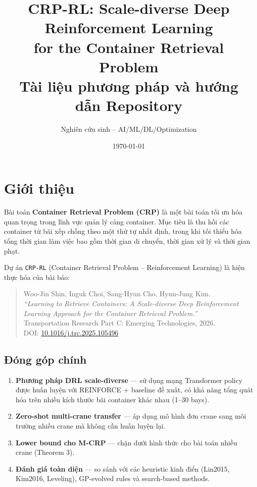 \documentclass[11pt,a4paper]{article}
\title{\textbf{CRP-RL: Scale-diverse Deep Reinforcement Learning \\ for the Container Retrieval Problem}\\[4pt]
\large Tài liệu phương pháp và hướng dẫn Repository}
\author{Nghiên cứu sinh -- AI/ML/DL/Optimization}
\date{\today}
\theoremstyle{definition}
\begin{document}
\maketitle
\tableofcontents
\newpage

\section{Giới thiệu}

Bài toán \textbf{Container Retrieval Problem (CRP)} là một bài toán tối ưu hóa quan trọng trong lĩnh vực quản lý cảng container. Mục tiêu là thu hồi các container từ bãi xếp chồng theo một thứ tự nhất định, trong khi tối thiểu hóa tổng thời gian làm việc bao gồm thời gian di chuyển, thời gian xử lý và thời gian phạt.

Dự án \texttt{CRP-RL} (Container Retrieval Problem -- Reinforcement Learning) là hiện thực hóa của bài báo:
\begin{quote}
    Woo-Jin Shin, Inguk Choi, Sang-Hyun Cho, Hyun-Jung Kim. \\
    \textit{``Learning to Retrieve Containers: A Scale-diverse Deep Reinforcement Learning Approach for the Container Retrieval Problem.''} \\
    Transportation Research Part C: Emerging Technologies, 2026. \\
    DOI: \href{https://doi.org/10.1016/j.trc.2025.105496}{10.1016/j.trc.2025.105496}
\end{quote}

\subsection{Đóng góp chính}

\begin{enumerate}
    \item \textbf{Phương pháp DRL scale-diverse} — sử dụng mạng Transformer policy được huấn luyện với REINFORCE + baseline đề xuất, có khả năng tổng quát hóa trên nhiều kích thước bãi container khác nhau (1--30 bays).
    \item \textbf{Zero-shot multi-crane transfer} — áp dụng mô hình đơn crane sang môi trường nhiều crane mà không cần huấn luyện lại.
    \item \textbf{Lower bound cho M-CRP} — chặn dưới hình thức cho bài toán nhiều crane (Theorem 3).
    \item \textbf{Đánh giá toàn diện} — so sánh với các heuristic kinh điển (Lin2015, Kim2016, Leveling), GP-evolved rules và search-based methods.
\end{enumerate}
\end{document}
